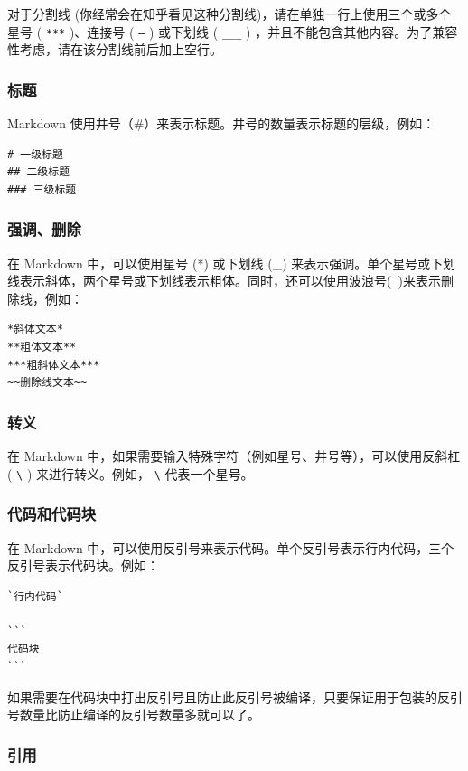 对于分割线 (你经常会在知乎看见这种分割线)，请在单独一行上使用三个或多个星号 ( \texttt{***} )、连接号 ( \texttt{---} ) 或下划线 ( \texttt{\_\_\_} ) ，并且不能包含其他内容。为了兼容性考虑，请在该分割线前后加上空行。

\subsubsection{标题}

Markdown 使用井号（\#）来表示标题。井号的数量表示标题的层级，例如：

\begin{verbatim}
# 一级标题
## 二级标题
### 三级标题
\end{verbatim}

\subsubsection{强调、删除}

在 Markdown 中，可以使用星号 (*) 或下划线 (\_) 来表示强调。单个星号或下划线表示斜体，两个星号或下划线表示粗体。同时，还可以使用波浪号(~)来表示删除线，例如：

\begin{verbatim}
*斜体文本*
**粗体文本**
***粗斜体文本***
~~删除线文本~~
\end{verbatim}

\subsubsection{转义}

在 Markdown 中，如果需要输入特殊字符（例如星号、井号等），可以使用反斜杠 ( \texttt{\textbackslash} ) 来进行转义。例如， \texttt{\textbackslash*}  代表一个星号。

\subsubsection{代码和代码块}

在 Markdown 中，可以使用反引号来表示代码。单个反引号表示行内代码，三个反引号表示代码块。例如：

\begin{verbatim}
`行内代码`

```
代码块
```
\end{verbatim}

如果需要在代码块中打出反引号且防止此反引号被编译，只要保证用于包装的反引号数量比防止编译的反引号数量多就可以了。

\subsubsection{引用}

